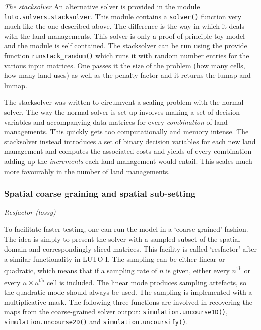\documentclass{draft}
\begin{document}
\emph{The stacksolver}
An alternative solver is provided in the module \texttt{luto.solvers.stacksolver}. This module contains a \texttt{solver()} function very much like the one described above. The difference is the way in which it deals with the land-managements. This solver is only a proof-of-principle toy model and the module is self contained. The stacksolver can be run using the provide function \texttt{runstack_random()} which runs it with random number entries for the various input matrices. One passes it the size of the problem (how many cells, how many land uses) as well as the penalty factor and it returns the lumap and lmmap.

The stacksolver was written to circumvent a scaling problem with the normal solver. The way the normal solver is set up involves making a set of decision variables and accompanying data matrices for every \emph{combination} of land managements. This quickly gets too computationally and memory intense. The stacksolver instead introduces a set of binary decision variables for each new land management and computes the associated costs and yields of every combination adding up the \emph{increments} each land management would entail. This scales much more favourably in the number of land managements. 

\subsubsection{Spatial coarse graining and spatial sub-setting}

\emph{Resfactor (lossy)}

To facilitate faster testing, one can run the model in a `coarse-grained' fashion. The idea is simply to present the solver with a sampled subset of the spatial domain and correspondingly sliced matrices. This facility is called `resfactor' after a similar functionality in LUTO I. The sampling can be either linear or quadratic, which means that if a sampling rate of $n$ is given, either every $n$\textsuperscript{th} or every $n \times n$\textsuperscript{th} cell is included. The linear mode produces sampling artefacts, so the quadratic mode should always be used. The sampling is implemented with a multiplicative mask. The following three functions are involved in recovering the maps from the coarse-grained solver output: \texttt{simulation.uncourse1D()}, \texttt{simulation.uncourse2D()} and \texttt{simulation.uncoursify()}.
\end{document}
